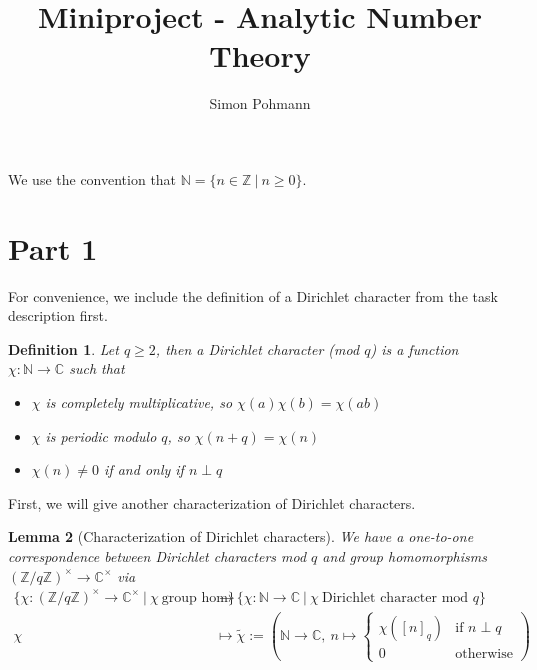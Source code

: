 \documentclass{scrartcl}
\title{Miniproject - Analytic Number Theory}
\author{Simon Pohmann}
\date{}
\newcommand{\N}{\mathbb{N}}
\newcommand{\Z}{\mathbb{Z}}
\newcommand{\C}{\mathbb{C}}
\newcommand{\units}{\times}
\newtheorem{definition}{Definition}
\newtheorem{lemma}[definition]{Lemma}
\begin{document}
\maketitle

We use the convention that $\N = \{ n \in \Z \ | \ n \geq 0 \}$.

\section{Part 1}

For convenience, we include the definition of a Dirichlet character from the task description first.
\begin{definition}
    Let $q \geq 2$, then a \emph{Dirichlet character (mod $q$)} is a function $\chi: \N \to \C$ such that
    \begin{itemize}
        \item $\chi$ is completely multiplicative, so $\chi(a)\chi(b) = \chi(ab)$
        \item $\chi$ is periodic modulo $q$, so $\chi(n + q) = \chi(n)$
        \item $\chi(n) \neq 0$ if and only if $n \perp q$
    \end{itemize}
\end{definition}
First, we will give another characterization of Dirichlet characters.
\begin{lemma}[Characterization of Dirichlet characters]
    \label{prop:characterization_dirichlet_character}
    We have a one-to-one correspondence between Dirichlet characters mod $q$ and group homomorphisms $(\Z/q\Z)^\units \to \C^\units$ via
    \begin{align*}
        \{ \chi: (\Z/q\Z)^\units \to \C^\units \ | \ \chi \ \text{group hom} \} &\to \{ \chi: \N \to \C \ | \ \chi \ \text{Dirichlet character mod $q$} \} \\
        \chi &\mapsto \tilde{\chi} := \left( \N \to \C, \ n \mapsto \begin{cases}
            \chi([n]_q) & \text{if $n \perp q$} \\
            0 & \text{otherwise}
        \end{cases} \right)
    \end{align*}
\end{lemma}
\end{document}
